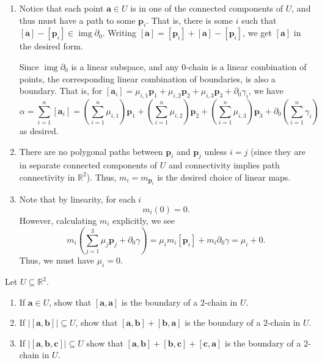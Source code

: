 \documentclass[12 pt, letterpaper]{hmcpset}
\begin{document}
\begin{solution}
	\begin{enumerate}
		\item Notice that each point $\mathbf{a} \in U$ is in one of the connected components of $U$, and thus must have a path to some $\mathbf{p}_{i}$. That is, there is some $i$ such that $[\mathbf{a}] - [\mathbf{p}_{i}] \in \operatorname{img} \partial_{0}$. Writing $[\mathbf{a}] = [\mathbf{p}_{i}] + [\mathbf{a}] - [\mathbf{p}_{i}]$, we get $[\mathbf{a}]$ in the desired form.

			Since $\operatorname{img} \partial_{0}$ is a linear subspace, and any $0$-chain is a linear combination of points, the corresponding linear combination of boundaries, is also a boundary. That is, for $[\mathbf{a}_{i}] = \mu_{i, 1} \mathbf{p}_{1} + \mu_{i, 2} \mathbf{p}_{2} + \mu_{i, 3} \mathbf{p}_{3} + \partial_{0} \gamma_{i}$, we have
			\[
				\alpha = \sum_{i = 1}^{n} [\mathbf{a}_{i}] = \left ( \sum_{i = 1}^{n} \mu_{i, 1} \right ) \mathbf{p}_{1} + \left ( \sum_{i = 1}^{n} \mu_{i, 2} \right ) \mathbf{p}_{2} + \left ( \sum_{i = 1}^{n} \mu_{i, 3} \right ) \mathbf{p}_{3} + \partial_{0} \left ( \sum_{i = 1}^{n} \gamma_{i} \right )
			\]
			as desired.
		\item There are no polygonal paths between $\mathbf{p}_{i}$ and $\mathbf{p}_{j}$ unless $i = j$ (since they are in separate connected components of $U$ and connectivity implies path connectivity in $\mathbb{R}^{2}$). Thus, $m_{i} = m_{\mathbf{p}_{i}}$ is the desired choice of linear maps.

		\item Note that by linearity, for each $i$
			\[
				m_{i}(0) = 0.
			\]
			However, calculating $m_{i}$ explicitly, we see
			\[
				m_{i}\left ( \sum_{j = 1}^{3} \mu_{j} \mathbf{p}_{j} + \partial_{0} \gamma \right ) = \mu_{i} m_{i}[\mathbf{p}_{i}] + m_{i} \partial_{0} \gamma = \mu_{i} + 0.
			\]
			Thus, we must have $\mu_{i} = 0$.
	\end{enumerate}
\end{solution}

\pagebreak

\begin{problem}[24.]
	Let $U \subseteq \mathbb{R}^{2}$.
	\begin{enumerate}
		\item If $\mathbf{a} \in U$, show that $[\mathbf{a}, \mathbf{a}]$ is the boundary of a $2$-chain in $U$.
		\item If $\lvert [\mathbf{a}, \mathbf{b}] \rvert \subseteq U$, show that $[\mathbf{a}, \mathbf{b}] + [\mathbf{b}, \mathbf{a}]$ is the boundary of a $2$-chain in $U$.
		\item If $\lvert [\mathbf{a}, \mathbf{b}, \mathbf{c}] \rvert \subseteq U$ show that $[\mathbf{a}, \mathbf{b}] + [\mathbf{b}, \mathbf{c}] + [\mathbf{c}, \mathbf{a}]$ is the boundary of a $2$-chain in $U$.
	\end{enumerate}
\end{problem}
\end{document}
